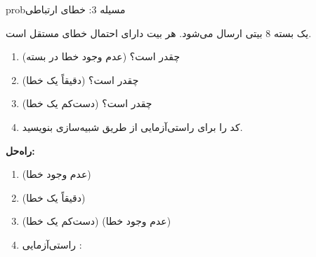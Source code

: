 \begin{PSbox}[unbreakable]{prob}{مسیله 3: خطای ارتباطی}

یک بسته 8 بیتی ارسال می‌شود. هر بیت دارای احتمال خطای مستقل  است.

\begin{enumerate}
\def\labelenumi{(\alph{enumi})}
\tightlist
\item
  (عدم وجود خطا در بسته) چقدر است؟
\item
  (دقیقاً یک خطا) چقدر است؟
\item
  (دست‌کم یک خطا) چقدر است؟
\item
  کد  را برای راستی‌آزمایی از طریق شبیه‌سازی بنویسید.
\end{enumerate}

\textbf{راه‌حل:}

\begin{enumerate}
\def\labelenumi{(\alph{enumi})}
\item
  (عدم وجود خطا) 
\item
  (دقیقاً یک خطا) 
\item
  (دست‌کم یک خطا) (عدم وجود خطا) 
\item
  راستی‌آزمایی :
\end{enumerate}



\end{PSbox}
